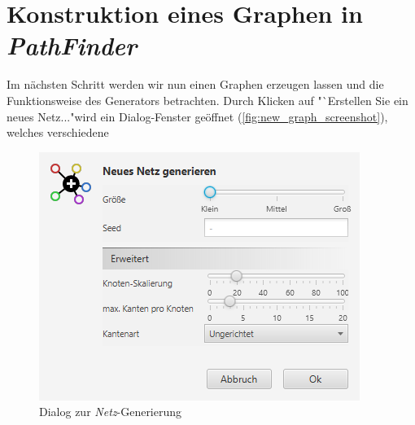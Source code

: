 \documentclass[12pt]{article}
\begin{document}
\section{Konstruktion eines Graphen in \textit{PathFinder}}
\label{sec:construct}
Im nächsten Schritt werden wir nun einen Graphen erzeugen lassen und die Funktionsweise des Generators betrachten. Durch Klicken auf "`Erstellen Sie ein neues Netz..."\;wird ein Dialog-Fenster geöffnet (\autoref{fig:new_graph_screenshot}), welches verschiedene 

\begin{figure}
\vspace{-20pt}
\begin{center}
\includegraphics[scale=0.6]{res/new_graph_screenshot.png}
\end{center}
\vspace{-20pt}
\centering
\caption{Dialog zur \textit{Netz}-Generierung}
\label{fig:new_graph_screenshot}
\end{figure}
\end{document}
